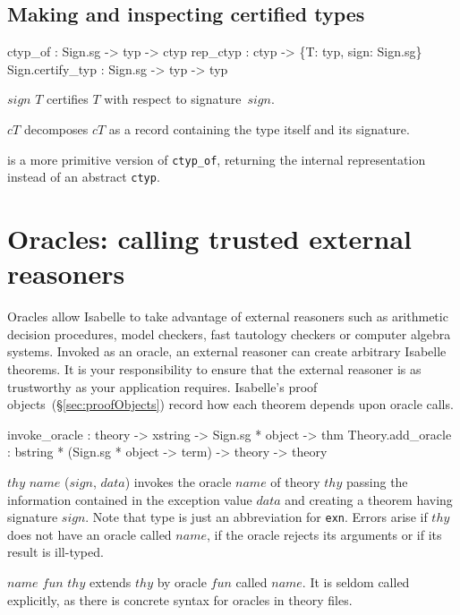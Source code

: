 \subsection{Making and inspecting certified types}
\begin{ttbox}
ctyp_of          : Sign.sg -> typ -> ctyp
rep_ctyp         : ctyp -> \{T: typ, sign: Sign.sg\}
Sign.certify_typ : Sign.sg -> typ -> typ
\end{ttbox}
\begin{ttdescription}
  
\item[\ttindexbold{ctyp_of} $sign$ $T$]  certifies
  $T$ with respect to signature~$sign$.
  
\item[\ttindexbold{rep_ctyp} $cT$] decomposes $cT$ as a record
  containing the type itself and its signature.
  
\item[\ttindexbold{Sign.certify_typ}] is a more primitive version of
  \texttt{ctyp_of}, returning the internal representation instead of
  an abstract \texttt{ctyp}.

\end{ttdescription}


\section{Oracles: calling trusted external reasoners}
\label{sec:oracles}

Oracles allow Isabelle to take advantage of external reasoners such as
arithmetic decision procedures, model checkers, fast tautology checkers or
computer algebra systems.  Invoked as an oracle, an external reasoner can
create arbitrary Isabelle theorems.  It is your responsibility to ensure that
the external reasoner is as trustworthy as your application requires.
Isabelle's proof objects~(\S\ref{sec:proofObjects}) record how each theorem
depends upon oracle calls.

\begin{ttbox}
invoke_oracle     : theory -> xstring -> Sign.sg * object -> thm
Theory.add_oracle : bstring * (Sign.sg * object -> term) -> theory 
                    -> theory
\end{ttbox}
\begin{ttdescription}
\item[\ttindexbold{invoke_oracle} $thy$ $name$ ($sign$, $data$)]
  invokes the oracle $name$ of theory $thy$ passing the information
  contained in the exception value $data$ and creating a theorem
  having signature $sign$.  Note that type  is just an
  abbreviation for \texttt{exn}.  Errors arise if $thy$ does not have
  an oracle called $name$, if the oracle rejects its arguments or if
  its result is ill-typed.
  
\item[\ttindexbold{Theory.add_oracle} $name$ $fun$ $thy$] extends
  $thy$ by oracle $fun$ called $name$.  It is seldom called
  explicitly, as there is concrete syntax for oracles in theory files.
\end{ttdescription}

